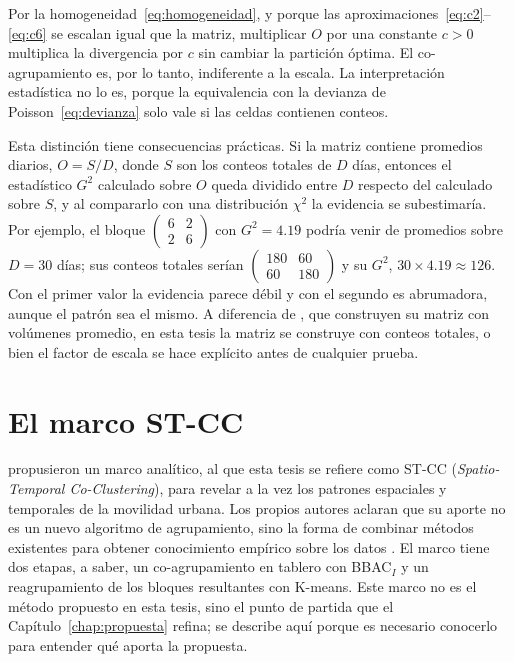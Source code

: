 Por la homogeneidad~\eqref{eq:homogeneidad}, y porque las
aproximaciones~\eqref{eq:c2}--\eqref{eq:c6} se escalan igual que la matriz,
multiplicar $O$ por una constante $c > 0$ multiplica la divergencia por $c$ sin
cambiar la partición óptima. El co-agrupamiento es, por lo tanto, indiferente a la
escala. La interpretación estadística no lo es, porque la equivalencia con la devianza
de Poisson~\eqref{eq:devianza} solo vale si las celdas contienen conteos.

Esta distinción tiene consecuencias prácticas. Si la matriz contiene promedios
diarios, $O = S / D$, donde $S$ son los conteos totales de $D$ días, entonces el
estadístico $G^2$ calculado sobre $O$ queda dividido entre $D$ respecto del
calculado sobre $S$, y al compararlo con una distribución $\chi^2$ la evidencia
se subestimaría. Por ejemplo, el bloque $\begin{pmatrix} 6 & 2 \\ 2 & 6 \end{pmatrix}$
con $G^2 = 4.19$ podría venir de promedios sobre $D = 30$ días; sus conteos totales
serían $\begin{pmatrix} 180 & 60 \\ 60 & 180 \end{pmatrix}$ y su $G^2$, $30 \times
4.19 \approx 126$. Con el primer valor la evidencia parece débil y con el segundo
es abrumadora, aunque el patrón sea el mismo. A diferencia de \citet{Liu2021},
que construyen su matriz con volúmenes promedio, en esta tesis la matriz se construye con conteos totales, o bien el factor de escala
se hace explícito antes de cualquier prueba.

\section{El marco ST-CC}\label{sec:stcc}

\citet{Liu2021} propusieron un marco analítico, al que esta tesis se refiere como
ST-CC (\emph{Spatio-Temporal Co-Clustering}), para revelar a la vez los patrones
espaciales y temporales de la movilidad urbana. Los propios autores aclaran que su
aporte no es un nuevo algoritmo de agrupamiento, sino la forma de combinar métodos
existentes para obtener conocimiento empírico sobre los datos
\citep[Sec.~I]{Liu2021}. El marco tiene dos etapas, a saber, un co-agrupamiento en tablero
con BBAC$_I$ y un reagrupamiento de los bloques resultantes con K-means.
Este marco no es el método propuesto en esta tesis, sino el punto de partida que
el Capítulo~\ref{chap:propuesta} refina; se describe aquí porque es necesario
conocerlo para entender qué aporta la propuesta.

